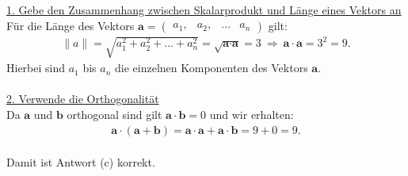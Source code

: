 \underline{1. Gebe den Zusammenhang zwischen Skalarprodukt und Länge eines Vektors an}\\
Für die Länge des Vektors $ \textbf{a} = \begin{pmatrix} a_1, & a_2, & ... & a_n  
\end{pmatrix}$ gilt:
\begin{align*}
\| a \| = \sqrt{a_1^2 + a_2^2+...+a_n^2}
= \sqrt{\textbf{a} \cdot \textbf{a}} = 3
\ \Rightarrow \
\textbf{a} \cdot \textbf{a} = 3^2 = 9.
\end{align*}
Hierbei sind $ a_1 $ bis $ a_n $ die einzelnen Komponenten des Vektors $ \textbf{a} $.\\
\\
\underline{2. Verwende die Orthogonalität}\\
Da $ \textbf{a} $ und $ \textbf{b} $ orthogonal sind gilt $ \textbf{a}\cdot \textbf{b} = 0 $ und wir erhalten:
\begin{align*}
\textbf{a} \cdot ( \textbf{a} + \textbf{b})
= \textbf{a} \cdot \textbf{a} +\textbf{a} \cdot \textbf{b}
= 9 + 0 = 9.
\end{align*}
\ \\
Damit ist Antwort (c) korrekt.
\newpage
